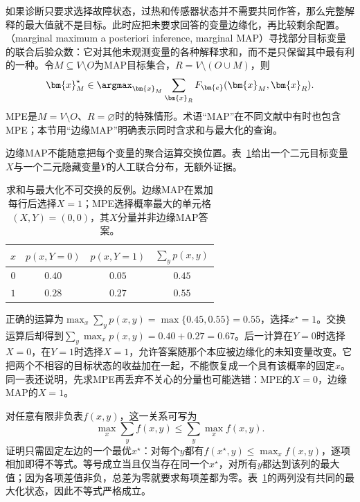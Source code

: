 如果诊断只要求选择故障状态，过热和传感器状态并不需要共同作答，那么完整解释的最大值就不是目标。此时应把未要求回答的变量边缘化，再比较剩余配置。（marginal maximum a posteriori inference, marginal MAP）寻找部分目标变量的联合后验众数：它对其他未观测变量的各种解释求和，而不是只保留其中最有利的一种。令$M\subseteq V\setminus O$为MAP目标集合，$R=V\setminus(O\cup M)$，则
\begin{equation}
  \bm{x}_M^\star
  \in\argmax_{\bm{x}_M}\sum_{\bm{x}_R}
       F_{\bm{e}}(\bm{x}_M,\bm{x}_R).
  \label{eq:pgm-elimination-map-objective}
\end{equation}
MPE是$M=V\setminus O$、$R=\varnothing$时的特殊情形。术语“MAP”在不同文献中有时也包含MPE；本节用“边缘MAP”明确表示同时含求和与最大化的查询。

边缘MAP不能随意把每个变量的聚合运算交换位置。表~\ref{tab:pgm-elimination-map-counterexample}给出一个二元目标变量$X$与一个二元隐藏变量$Y$的人工联合分布，无额外证据。

\begin{table}[htbp]
  \centering
  \begin{tabular}{cccc}
    \toprule
    $x$ & $p(x,Y=0)$ & $p(x,Y=1)$ & $\sum_y p(x,y)$\\
    \midrule
    $0$ & $0.40$ & $0.05$ & $0.45$\\
    $1$ & $0.28$ & $0.27$ & $0.55$\\
    \bottomrule
  \end{tabular}
  \caption{求和与最大化不可交换的反例。边缘MAP在累加每行后选择$X=1$；MPE选择概率最大的单元格$(X,Y)=(0,0)$，其$X$分量并非边缘MAP答案。}
  \label{tab:pgm-elimination-map-counterexample}
\end{table}

正确的运算为$\max_x\sum_y p(x,y)=\max\{0.45,0.55\}=0.55$，选择$x^\star=1$。交换运算后却得到$\sum_y\max_x p(x,y)=0.40+0.27=0.67$。后一计算在$Y=0$时选择$X=0$，在$Y=1$时选择$X=1$，允许答案随那个本应被边缘化的未知变量改变。它把两个不相容的目标状态的收益加在一起，不能恢复成一个具有该概率的固定$x$。同一表还说明，先求MPE再丢弃不关心的分量也可能选错：MPE的$X=0$，边缘MAP的$X=1$。

对任意有限非负表$f(x,y)$，这一关系可写为
\begin{equation}
  \max_x\sum_y f(x,y)
  \leq \sum_y\max_x f(x,y).
  \label{eq:pgm-elimination-sum-max-bound}
\end{equation}
证明只需固定左边的一个最优$x^\star$：对每个$y$都有$f(x^\star,y)\leq\max_x f(x,y)$，逐项相加即得不等式。等号成立当且仅当存在同一个$x^\star$，对所有$y$都达到该列的最大值；因为各项差值非负，总差为零就要求每项差都为零。表~\ref{tab:pgm-elimination-map-counterexample}的两列没有共同的最大化状态，因此不等式严格成立。

